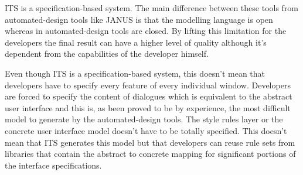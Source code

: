 ITS is a specification-based system. The main difference between these tools from automated-design tools like JANUS\cite{janus} is that the modelling language is open whereas in automated-design tools are closed. By lifting this limitation for the developers the final result can have a higher level of quality although it’s dependent from the capabilities of the developer himself.

Even though ITS is a specification-based system, this doesn’t mean that developers have to specify every feature of every individual window. Developers are forced to specify the content of dialogues which is equivalent to the abstract user interface and this is, as been proved to be by experience, the most difficult model to generate by the automated-design tools. The style rules layer or the concrete user interface model doesn’t have to be totally specified. This doesn’t mean that ITS generates this model but that developers can reuse rule sets from libraries that contain the abstract to concrete mapping for significant portions of the interface specifications.
